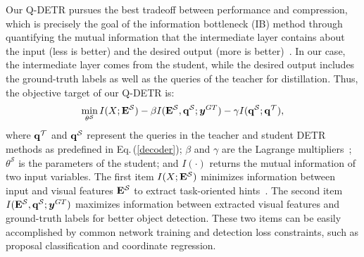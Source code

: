 \documentclass[10pt,twocolumn,letterpaper]{article}
\begin{document}
Our Q-DETR  pursues the best tradeoff between performance and compression, which is precisely the goal of the information bottleneck (IB) method through quantifying the mutual information that the intermediate layer contains about the input (less is better) and the desired output (more is better)~\cite{shwartz2017opening,tishby2000information}. 
%
In our case, the intermediate layer comes from the student, while the desired output includes the ground-truth labels as well as the queries of the teacher for distillation. 
%
Thus, the objective target of our Q-DETR is:
%
%
%
\begin{equation}
    \begin{aligned}
    \mathop{\min}_{\theta^{\mathcal{S}}} I(X; {\bf E}^{\mathcal{S}}) - \beta I( {\bf E}^{\mathcal{S}}, {\bf q}^{\mathcal{S}}; \bm{y}^{GT}) - \gamma I({\bf q}^{\mathcal{S}}; {\bf q}^{\mathcal{T}}), 
    \end{aligned}
    \label{eq:distill_IB}
\end{equation}
%
where ${\bf q}^{\mathcal{T}}$ and ${\bf q}^{\mathcal{S}}$ represent the queries in the teacher and student DETR methods as predefined in Eq.\,(\ref{decoder}); $\beta$ and $\gamma$ are the Lagrange multipliers~\cite{shwartz2017opening}; $\theta^{\mathcal{S}}$ is the parameters of the student; and $I(\cdot)$ returns the mutual information of two input variables. 
%
%
The first item $I(X; {\bf E}^{\mathcal{S}})$ minimizes information between input and visual features ${\bf E}^{\mathcal{S}}$ to extract task-oriented hints~\cite{wang2020bidet}. The second item $I( {\bf E}^{\mathcal{S}}, {\bf q}^{\mathcal{S}}; \bm{y}^{GT})$  maximizes information between extracted visual features and ground-truth labels for better object detection. These two items can be easily accomplished by common network training and detection loss constraints, such as proposal classification and coordinate regression.
\end{document}
